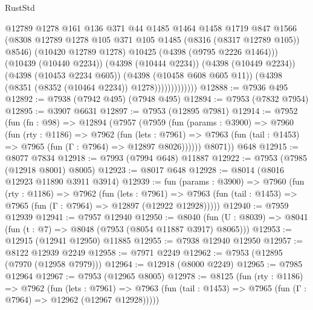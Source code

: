 \begin{lexlean}{RustStd}
\begin{coremodule}
                            @12789
                            @1278
                            @161
                            @136
                            @371
                            @44
                            @1485
                            @1464
                            @1458
                            @1719
                            @847
                            @1566
                            (@8308
                              @12789
                              @1278
                              @105
                              @371
                              @105
                              @1485
                              (@8316 (@8317 @12789 @105))
                              @8546)
                            (@10420 @12789 @1278)
                            @10425
                            (@4398 (@9795 @2226 @1464)))
                          (@10439 (@10440 @2234))
                          (@4398 (@10444 @2234))
                          (@4398 (@10449 @2234))
                          (@4398 (@10453 @2234 @605))
                          (@4398 (@10458 @608 @605 @11))
                          (@4398 (@8351 (@8352 (@10464 @2234)) @1278)))))))))))))
@12888 := @7936 @495
@12892 := @7938 (@7942 @495) (@7948 @495)
@12894 := @7953 (@7832 @7954)
@12895 := @3907 @6631
@12897 := @7953 (@12895 @7981)
@12914 := @7952
    (fun (fn : @98) =>
    @12894
      (@7957
        (@7959
          (fun (params : @3900) =>
          @7960
            (fun (rty : @1186) =>
            @7962
              (fun (lets : @7961) =>
              @7963 (fun (tail : @1453) => @7965 (fun (Γ : @7964) => @12897 @8026))))))
        @8071))
    @648
@12915 := @8077 @7834
@12918 := @7993 (@7994 @648) @11887
@12922 := @7953 (@7985 (@12918 @8001) @8005)
@12923 := @8017 @648
@12928 := @8014 (@8016 @12923 @11890 @3911 @3914)
@12939 := fun (params : @3900) =>
  @7960
    (fun (rty : @1186) =>
    @7962
      (fun (lets : @7961) =>
      @7963 (fun (tail : @1453) => @7965 (fun (Γ : @7964) => @12897 (@12922 @12928)))))
@12940 := @7959 @12939
@12941 := @7957 @12940
@12950 := @8040
    (fun (U : @8039) => @8041 (fun (t : @7) => @8048 (@7953 (@8054 @11887 @3917) @8065)))
@12953 := @12915 (@12941 @12950) @11885
@12955 := @7938 @12940 @12950
@12957 := @8122 @12939 @2249
@12958 := @7971 @2249
@12962 := @7953 (@12895 (@7970 (@12958 @7979)))
@12964 := @12918 (@8000 @2249)
@12965 := @7985 @12964
@12967 := @7953 (@12965 @8005)
@12978 := @8125
    (fun (rty : @1186) =>
    @7962
      (fun (lets : @7961) =>
      @7963 (fun (tail : @1453) => @7965 (fun (Γ : @7964) => @12962 (@12967 @12928)))))

\end{coremodule}
\end{lexlean}
